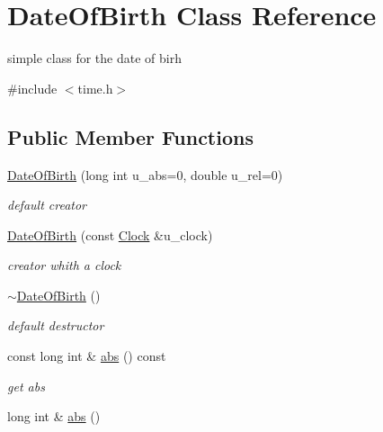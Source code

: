 \hypertarget{classDateOfBirth}{
\section{DateOfBirth Class Reference}
\label{classDateOfBirth}
}


simple class for the date of birh  




{\ttfamily \#include $<$time.h$>$}

\subsection*{Public Member Functions}
\begin{DoxyCompactItemize}
\item 
\hyperlink{classDateOfBirth_a2b781b44d207a48f9a17066a54c33bd1}{DateOfBirth} (long int u\_\-abs=0, double u\_\-rel=0)
\begin{DoxyCompactList}\small\item\em default creator \end{DoxyCompactList}\item 
\hyperlink{classDateOfBirth_a858604e5921287e5cb35dcadbff2689c}{DateOfBirth} (const \hyperlink{classClock}{Clock} \&u\_\-clock)
\begin{DoxyCompactList}\small\item\em creator whith a clock \end{DoxyCompactList}\item 
\hypertarget{classDateOfBirth_a9da1d12a3ef90a918bdea5a077e47f89}{
\hyperlink{classDateOfBirth_a9da1d12a3ef90a918bdea5a077e47f89}{$\sim$DateOfBirth} ()}
\label{classDateOfBirth_a9da1d12a3ef90a918bdea5a077e47f89}

\begin{DoxyCompactList}\small\item\em default destructor \end{DoxyCompactList}\item 
\hypertarget{classDateOfBirth_a4abde2ade51debf11060f515c157b658}{
const long int \& \hyperlink{classDateOfBirth_a4abde2ade51debf11060f515c157b658}{abs} () const }
\label{classDateOfBirth_a4abde2ade51debf11060f515c157b658}

\begin{DoxyCompactList}\small\item\em get abs \end{DoxyCompactList}\item 
\hypertarget{classDateOfBirth_a15399ab56a0b32b64d4b4ead601ba657}{
long int \& \hyperlink{classDateOfBirth_a15399ab56a0b32b64d4b4ead601ba657}{abs} ()}
\label{classDateOfBirth_a15399ab56a0b32b64d4b4ead601ba657}


\end{DoxyCompactItemize}

